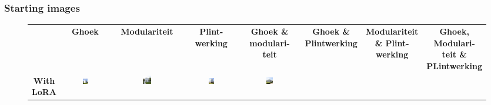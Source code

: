 \subsubsection{Starting images}
\begin{figure}[H]
  \centering
  {\footnotesize
  \renewcommand{\arraystretch}{1.1}
  \setlength{\tabcolsep}{4pt}
  \begin{tabular}{c c c c c c c c}
    & \textbf{Ghoek} & \textbf{Modulariteit} & \shortstack{\textbf{Plint-}\\\textbf{werking}}
    & \shortstack{\textbf{Ghoek \&}\\ \textbf{modulari-}\\\textbf{teit}} 
    & \shortstack{\textbf{Ghoek \&}\\ \textbf{Plintwerking}} 
    & \shortstack{\textbf{Modulariteit} \\ \textbf{ \& Plint-}\\\textbf{werking}} 
    & \shortstack{\textbf{Ghoek,}\\\textbf{Modulari-}\\\textbf{teit \&}\\\textbf{PLintwerking}} \\
    \shortstack{\textbf{With}\\\textbf{LoRA}} & 
    \includegraphics[width=0.12\textwidth]{Images/Methodology/Evaluation sessions/LAVA_Fixed-images/2-preliminary_design/Met_lora_00027_.png} & 
    \includegraphics[width=0.12\textwidth]{Images/Methodology/Evaluation sessions/LAVA_Fixed-images/2-preliminary_design/Met_lora_00028_.png} &
    \includegraphics[width=0.12\textwidth]{Images/Methodology/Evaluation sessions/LAVA_Fixed-images/2-preliminary_design/Met_lora_00030_.png} &
    \includegraphics[width=0.12\textwidth]{Images/Methodology/Evaluation sessions/LAVA_Fixed-images/2-preliminary_design/Met_lora_00035_.png} &

\end{tabular}}
\end{figure}

